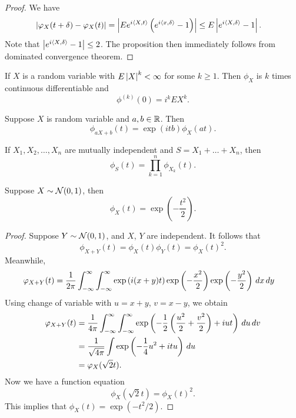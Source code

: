 \documentclass[a4paper]{article}
\begin{document}
\begin{proof}
  We have
  \begin{align*}
    \left\lvert \varphi_X (t + \delta) - \varphi_X (t)\right\rvert
     & = \left\lvert  E e^{i \left\langle X, t \right\rangle} \left( e^{i \left\langle x, \delta \right\rangle} - 1 \right) \right\rvert
    \leq E \left\lvert  e^{i \left\langle X, \delta \right\rangle} - 1 \right\rvert.
  \end{align*}
  Note that $\left\lvert e^{i \left\langle X, \delta \right\rangle} - 1\right\rvert \leq 2$. The proposition
  then immediately follows from dominated convergence theorem.
\end{proof}

\begin{prop}
  If $X$ is a random variable with $E \left\lvert X\right\rvert^k < \infty$
  for some $k \geq 1$. Then $\phi_X$ is $k$ times continuous
  differentiable and
  \[
    \phi^{(k)}(0) = i^k E X^k.
  \]
\end{prop}

\begin{prop}
  Suppose $X$ is random variable and $a, b \in \mathbb{R}$. Then
  \[
    \phi_{aX + b} (t) = \exp (itb) \phi_X (at).
  \]
\end{prop}

\begin{prop}
  If $X_1, X_2, \dots, X_n$ are mutually independent and
  $S = X_1 + \dots + X_n$, then
  \[
    \phi_S (t) = \prod_{k=1}^n \phi_{X_k} (t).
  \]
\end{prop}

\begin{prop}
  Suppose $X \sim \mathcal{N} (0, 1)$, then
  \[
    \phi_X (t) = \exp \left( - \frac{t^2}{2} \right).
  \]
\end{prop}

\begin{proof}
  Suppose $Y \sim \mathcal{N} (0, 1)$, and $X$, $Y$ are independent.
  It follows that
  \[
    \phi_{X + Y} (t) = \phi_X (t) \phi_Y (t) = \phi_X (t)^2.
  \]
  Meanwhile,
  \begin{align*}
    \varphi_{X + Y} (t)
     & = \frac{1}{2 \pi} \int_{-\infty}^\infty \int_{-\infty}^\infty
    \exp \left( i (x + y) t \right)
    \exp \left( - \frac{x^2}{2} \right)
    \exp \left( - \frac{y^2}{2} \right)
    \, d x \, d y
  \end{align*}
  Using change of variable with $u = x + y$, $v = x - y$, we obtain
  \begin{align*}
    \varphi_{X + Y} (t)
     & = \frac{1}{4 \pi} \int_{-\infty}^\infty \int_{-\infty}^\infty
    \exp \left( -\frac{1}{2} \left( \frac{u^2}{2}
    + \frac{v^2}{2} \right) + i u t \right)
    \, d u \, d v                                                        \\
     & = \frac{1}{\sqrt{4 \pi}} \int \exp
    \left( - \frac{1}{4} u^2 + i t u \right) \, d u                    \\
     & = \varphi_X (\sqrt{2} t).
  \end{align*}
  Now we have a function equation
  \[
    \phi_X (\sqrt{2} t) = \phi_X (t)^2.
  \]
  This implies that $\phi_X (t) = \exp (- t^2 / 2)$.

\end{proof}
\end{document}
